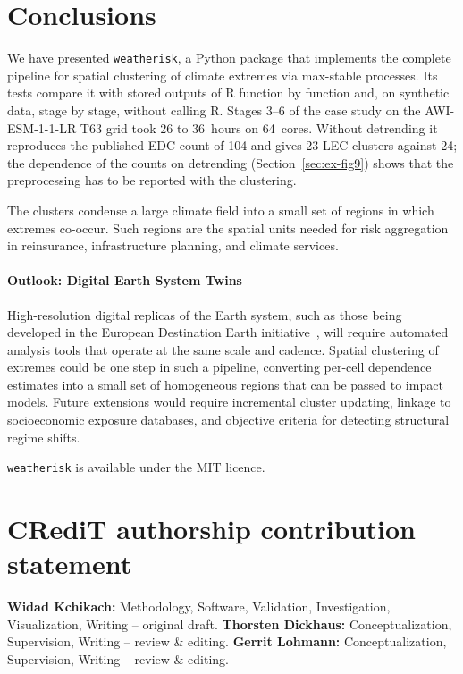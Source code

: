 \documentclass[preprint,12pt,a4paper]{elsarticle}
\newcommand{\revb}[1]{{#1}}
\newcommand{\revg}[1]{{#1}}
\newcommand{\revo}[1]{{#1}}
\begin{document}
\section{Conclusions}
\label{sec:conclusions}

\revo{We have presented \texttt{weatherisk}, a Python package that
implements the complete pipeline for spatial clustering of climate
extremes via max-stable processes.} \revg{Its tests compare it with
stored outputs of R function by function and, on synthetic data,
stage by stage, without calling R. Stages 3--6 of the
\revb{case study} on the AWI-ESM-1-1-LR T63 grid took 26 to 36~hours
on 64~cores. Without detrending it reproduces the published EDC count
of 104 and gives 23 LEC clusters against 24; the dependence of the
counts on detrending (Section~\ref{sec:ex-fig9}) shows that the
preprocessing has to be reported with the clustering.}

\revg{The clusters condense a large climate field into a small set of
regions in which extremes co-occur. Such regions are the spatial units
needed for risk aggregation in reinsurance, infrastructure planning,
and climate services.}

\revg{\paragraph{Outlook: Digital Earth System Twins}
High-resolution digital replicas of the Earth system, such as those
being developed in the European Destination Earth
initiative~\cite{bauer2021}, will require automated analysis tools
that operate at the same scale and cadence.
Spatial clustering of extremes could be one step in such a pipeline,
converting per-cell dependence estimates into a small set of
homogeneous regions that can be passed to impact models.
Future extensions would require incremental cluster updating, linkage
to socioeconomic exposure databases, and objective criteria for
detecting structural regime shifts.}

\revg{\texttt{weatherisk} is available under the MIT licence.}


\section*{CRediT authorship contribution statement}
\textbf{Widad Kchikach:} Methodology, Software, Validation,
Investigation, Visualization, Writing -- original draft.
\textbf{Thorsten Dickhaus:} Conceptualization, Supervision,
Writing -- review \& editing.
\textbf{Gerrit Lohmann:} Conceptualization, Supervision,
Writing -- review \& editing.
\end{document}
